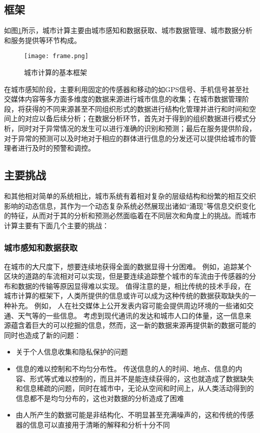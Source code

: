 \subsection{框架}
如图\ref{fig:1.1}所示，城市计算主要由城市感知和数据获取、城市数据管理、城市数据分析和服务提供等环节构成。
\begin{figure}[ht]
\centering
\texttt{[image: frame.png]}
\caption{城市计算的基本框架\cite{zheng2014urban}}
\label{fig:1.1}
\end{figure}
在城市感知阶段，主要利用固定的传感器和移动的如GPS信号、手机信号甚至社交媒体内容等多方面多维度的数据来源进行城市信息的收集；在城市数据管理阶段，将获得的不同来源甚至不同组织形式的数据进行结构化管理并进行和时间和空间上的对应以备后续分析；在数据分析环节，首先对于得到的组织数据进行模式分析，同时对于异常情况的发生可以进行准确的识别和预测；最后在服务提供阶段，对于异常的预测可以及时地对于相应的群体进行信息的分发还可以提供给城市的管理者进行及时的预警和调控。
\subsection{主要挑战}
和其他相对简单的系统相比，城市系统有着相对复杂的层级结构和纷繁的相互交织影响的动态信息，其作为一个动态复杂系统必然展现出诸如“涌现”等信息交织变化的特征\cite{anderson1972more}，从而对于其的分析和预测必然面临着在不同层次和角度上的挑战。而城市计算主要有下面几个主要的挑战：
\subsubsection*{城市感知和数据获取}
在城市的大尺度下，想要连续地获得全面的数据显得十分困难。 例如，追踪某个区块的道路的车流相对可以实现，但是要连续追踪整个城市的车流由于传感器的分布和数据的传输等原因显得难以实现。 值得注意的是，相比传统的技术手段，在城市计算的框架下，人类所提供的信息或许可以成为这种传统的数据获取缺失的一种补充。 例如， 人在社交媒体上公开发表内容可能会提供周边环境的一些诸如交通、天气等的一些信息。 考虑到现代通讯的发达和城市人口的体量，这一信息来源蕴含着巨大的可以挖掘的信息，然而，这一新的数据来源再提供新的数据可能的同时也造成了新的问题：
\begin{itemize}
	\item 关于个人信息收集和隐私保护的问题
	\item 信息的难以控制和不均匀分布性。 传送信息的人的时间、地点、信息的内容、形式等式难以控制的，而且并不是能连续获得的，这也就造成了数据缺失和信息稀疏的问题，同时在城市中，无论从空间和时间上，从人类活动得到的信息都不是均匀分布的，这也对数据的分析造成了困难
	\item 由人所产生的数据可能是非结构化、不明显甚至充满噪声的，这和传统的传感器的信息可以直接用于清晰的解释和分析十分不同
\end{itemize}

